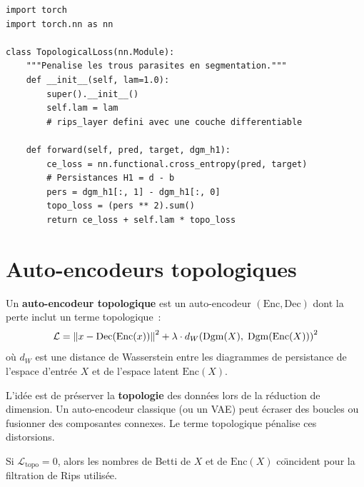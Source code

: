 \begin{verbatim}
import torch
import torch.nn as nn

class TopologicalLoss(nn.Module):
    """Penalise les trous parasites en segmentation."""
    def __init__(self, lam=1.0):
        super().__init__()
        self.lam = lam
        # rips_layer defini avec une couche differentiable

    def forward(self, pred, target, dgm_h1):
        ce_loss = nn.functional.cross_entropy(pred, target)
        # Persistances H1 = d - b
        pers = dgm_h1[:, 1] - dgm_h1[:, 0]
        topo_loss = (pers ** 2).sum()
        return ce_loss + self.lam * topo_loss
\end{verbatim}

\section{Auto-encodeurs topologiques}
\label{sec:autoencodeurs_topo}

\begin{definition}
Un \textbf{auto-encodeur topologique} est un auto-encodeur
$(\mathrm{Enc}, \mathrm{Dec})$ dont la perte inclut un terme
topologique~:
\[
  \mathcal{L} = \left\| x - \mathrm{Dec}(\mathrm{Enc}(x)) \right\|^2
  + \lambda \cdot d_W\!\left(\mathrm{Dgm}(X),\;
  \mathrm{Dgm}(\mathrm{Enc}(X))\right)^2
\]
o\`u $d_W$ est une distance de Wasserstein entre les diagrammes
de persistance de l'espace d'entr\'ee $X$ et de l'espace latent
$\mathrm{Enc}(X)$.
\end{definition}

\begin{intuition}
L'id\'ee est de pr\'eserver la \textbf{topologie} des donn\'ees
lors de la r\'eduction de dimension. Un auto-encodeur classique (ou
un VAE) peut \'ecraser des boucles ou fusionner des composantes
connexes. Le terme topologique p\'enalise ces distorsions.
\end{intuition}

\begin{proposition}
Si $\mathcal{L}_{\mathrm{topo}} = 0$, alors les nombres de Betti
de $X$ et de $\mathrm{Enc}(X)$ co\"\i ncident pour la filtration
de Rips utilis\'ee.
\end{proposition}

